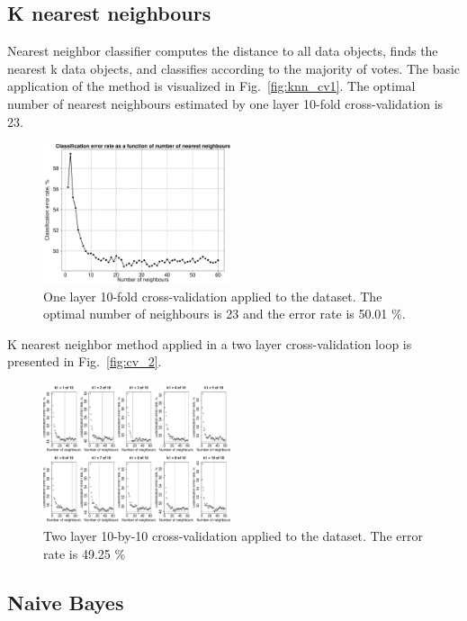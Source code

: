 \documentclass[10pt, paper=a4]{article}
\begin{document}
\subsection{K nearest neighbours}

Nearest neighbor classifier computes the distance to all data objects,
finds the nearest k data objects, and classifies according to the
majority of votes.  The basic application of the method is visualized
in Fig.~\ref{fig:knn_cv1}.  The optimal number of nearest neighbours
estimated by one layer 10-fold cross-validation is 23.

\begin{figure}[htbp]
  \centering
  \includegraphics[width = 0.49\textwidth]{k_nearest_neighbours_err_CV1.pdf}
  \caption{One layer 10-fold cross-validation applied to the dataset.
    The optimal number of neighbours is 23 and the error rate is 50.01
    \%.}
  \label{fig:knn_cv_1}
\end{figure}

K nearest neighbor method applied in a two layer cross-validation loop
is presented in Fig.~\ref{fig:cv_2}.

\begin{figure}[htbp]
  \centering
  \includegraphics[width = 0.49\textwidth]{k_nearest_neighbours_err_CV2.pdf}
  \caption{Two layer 10-by-10 cross-validation applied to the
    dataset. The error rate is 49.25 \%}
  \label{fig:knn_cv_2}
\end{figure}


\subsection{Naive Bayes}
\end{document}
